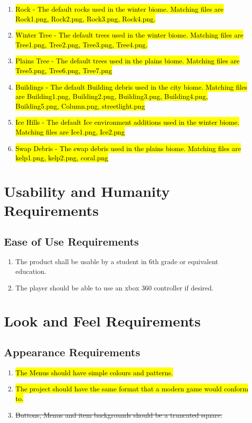 \documentclass{article}
\begin{document}
\begin{enumerate}[{Environment}1.]
	\item \hl{Rock - The default rocks used in the winter biome. Matching files are Rock1.png, Rock2.png, Rock3.png, Rock4.png.}
	\item \hl{Winter Tree - The default trees used in the winter biome. Matching files are Tree1.png, Tree2.png, Tree3.png, Tree4.png.}
	\item \hl{Plains Tree - The default trees used in the plains biome. Matching files are Tree5.png, Tree6.png, Tree7.png }
	\item \hl{Buildings - The default Building debris used in the city biome. Matching files are Building1.png, Building2.png, Building3.png, Building4.png, Building5.png, Column.png, streetlight.png}
	\item \hl{Ice Hills - The default Ice environment additions used in the winter biome. Matching files are Ice1.png, Ice2.png}
	\item \hl{Swap Debris - The swap debris used in the plains biome. Matching files are kelp1.png, kelp2.png, coral.png}
\end{enumerate}
\section{Usability and Humanity Requirements}
\subsection{Ease of Use Requirements}
\begin{enumerate}[{EUR}1. ]
	\item The product shall be usable by a student in 6th grade or equivalent education.
	\item The player should be able to use an xbox 360 controller if desired.
\end{enumerate}
\section{Look and Feel Requirements}
\subsection{Appearance Requirements}
\begin{enumerate}[{APPR}1. ]
	\item \hl{The Menus should have simple colours and patterns.}
	\item \hl{The project should have the same format that a modern game would conform to.}
	\item \st{Buttons, Menus and item backgrounds should be a truncated square.}
\end{enumerate}
\end{document}

